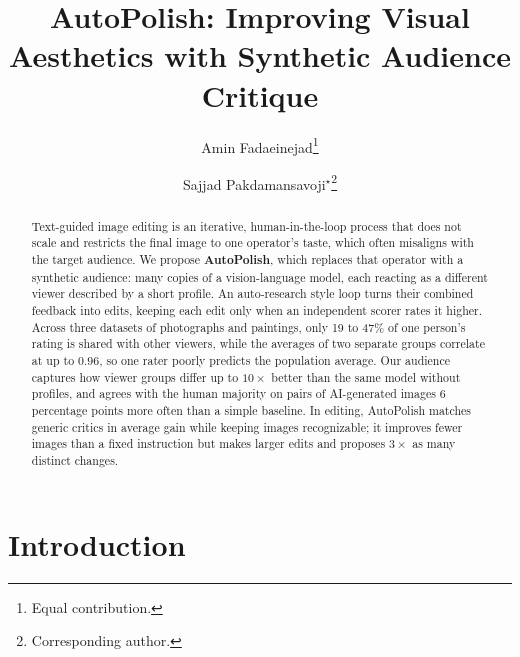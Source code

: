 \documentclass[runningheads]{llncs}
\begin{document}
\title{AutoPolish: Improving Visual Aesthetics with Synthetic Audience Critique}


\author{Amin Fadaeinejad\thanks{Equal contribution.} \and
Sajjad Pakdamansavoji$^{\star}$\thanks{Corresponding author.}}



\maketitle

\begin{abstract}
Text-guided image editing is an iterative, human-in-the-loop process that does not scale and restricts the final image to one operator's taste, which often misaligns with the target audience. We propose \textbf{AutoPolish}, which replaces that operator with a synthetic audience: many copies of a vision-language model, each reacting as a different viewer described by a short profile. An auto-research style loop turns their combined feedback into edits, keeping each edit only when an independent scorer rates it higher. Across three datasets of photographs and paintings, only 19 to 47\% of one person's rating is shared with other viewers, while the averages of two separate groups correlate at up to $0.96$, so one rater poorly predicts the population average. Our audience captures how viewer groups differ up to $10\times$ better than the same model without profiles, and agrees with the human majority on pairs of AI-generated images 6 percentage points more often than a simple baseline. In editing, AutoPolish matches generic critics in average gain while keeping images recognizable; it improves fewer images than a fixed instruction but makes larger edits and proposes $3\times$ as many distinct changes.

\end{abstract}


\section{Introduction}
\end{document}
